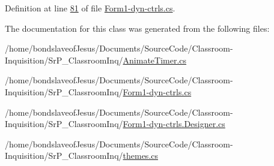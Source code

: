 \-Definition at line \hyperlink{_form1-dyn-ctrls_8cs_source_l00081}{81} of file \hyperlink{_form1-dyn-ctrls_8cs_source}{\-Form1-\/dyn-\/ctrls.\-cs}.



\-The documentation for this class was generated from the following files\-:\begin{DoxyCompactItemize}
\item 
/home/bondslaveof\-Jesus/\-Documents/\-Source\-Code/\-Classroom-\/\-Inquisition/\-Sr\-P\-\_\-\-Classroom\-Inq/\hyperlink{_animate_timer_8cs}{\-Animate\-Timer.\-cs}\item 
/home/bondslaveof\-Jesus/\-Documents/\-Source\-Code/\-Classroom-\/\-Inquisition/\-Sr\-P\-\_\-\-Classroom\-Inq/\hyperlink{_form1-dyn-ctrls_8cs}{\-Form1-\/dyn-\/ctrls.\-cs}\item 
/home/bondslaveof\-Jesus/\-Documents/\-Source\-Code/\-Classroom-\/\-Inquisition/\-Sr\-P\-\_\-\-Classroom\-Inq/\hyperlink{_form1-dyn-ctrls_8_designer_8cs}{\-Form1-\/dyn-\/ctrls.\-Designer.\-cs}\item 
/home/bondslaveof\-Jesus/\-Documents/\-Source\-Code/\-Classroom-\/\-Inquisition/\-Sr\-P\-\_\-\-Classroom\-Inq/\hyperlink{themes_8cs}{themes.\-cs}\end{DoxyCompactItemize}
